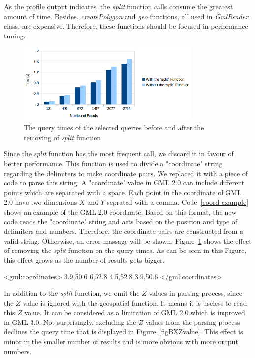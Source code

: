 \documentclass[a4paper,12pt]{article}
\begin{document}
As the profile output indicates, the \textit{split} function calls consume the greatest amount of time. Besides, \textit{createPolygon} and \textit{geo} functions, all used in \textit{GmlReader} class, are expensive. Therefore, these functions should be focused in performance tuning. 
\begin{figure}
\centering
\includegraphics[width=0.8\textwidth,height=0.2\textheight]{BXSplit}
\caption{The query times of the selected queries before and after the removing of \textit{split} function}
\label{figBXSplit}
\end{figure}
Since the \textit{split} function has the most frequent call, we discard it in favour of better performance. This function is used to divide a "coordinate" string regarding the delimiters to make coordinate pairs. We replaced it with a piece of code to parse this string. 
A "coordinate" value in GML 2.0 can include different points which are separated with a space. Each point in the coordinate of GML 2.0 have two dimensions $X$ and $Y$ seprated with a comma. Code~\ref{coord-example} shows an example of the GML 2.0 coordinate. Based on this format, the new code reads the "coordinate" string and acts based on the position and type of delimiters and numbers. Therefore, the coordinate pairs are constructed from a valid string. Otherwise, an error massage will be shown. Figure~\ref{figBXSplit} shows the effect of removing the \textit{split} function on the query times. As can be seen in this Figure, this effect grows as the number of results gets bigger.
 
\vspace{10px}
\begin{fakeXML}[label=coord-example,caption=An example of GML 2.0 coordinate]
<gml:coordinates>
  3.9,50.6 6,52.8 4.5,52.8 3.9,50.6
</gml:coordinates>
\end{fakeXML}
\vspace{10px}

In addition to the \textit{split} function, we omit the $Z$ values in parsing process, since the $Z$ value is ignored with the geospatial function. It means it is useless to read this $Z$ value. It can be considered as a limitation of GML 2.0 which is improved in GML 3.0. Not surprisingly, excluding the $Z$ values from the parsing process declines the query time that is displayed in Figure~\ref{figBXZvalue}. This effect is minor in the smaller number of results and is more obvious with more output numbers.
\end{document}
